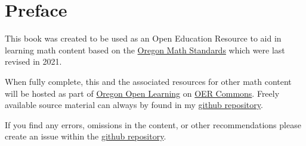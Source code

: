 \chapter{Preface}\label{chapter:preface}
This book was created to be used as an Open Education Resource to aid in learning math content based on the \href{https://www.oregon.gov/ode/educator-resources/standards/mathematics/Pages/MathStandards.aspx}{Oregon Math Standards} which were last revised in 2021.

When fully complete, this and the associated resources for other math content will be hosted as part of \href{https://oercommons.org/groups/oregon-mathematics/4871/?__hub_id=73}{Oregon Open Learning} on \href{https://oercommons.org/}{OER Commons}. Freely available source material can always by found in my \href{https://github.com/PHSMath/IM1}{github repository}.

If you find any errors, omissions in the content, or other recommendations please create an issue within the \href{https://github.com/PHSMath/IM1/issues}{github repository}.